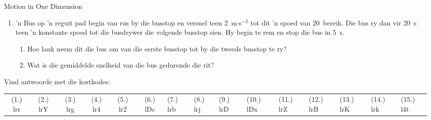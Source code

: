 \begin{eocexercises}{Motion in One Dimension}
\begin{enumerate}[noitemsep, label=\textbf{\arabic*}. ]
    \item 'n Bus op 'n reguit pad begin van rus by die busstop en versnel teen 2~m$\cdot$s$^{-2}$ tot dit 'n spoed van 20~\ms bereik. Die bus ry dan vir 20~s teen 'n konstante spoed tot die busdrywer die volgende busstop sien. Hy begin te rem en stop die bus in 5~s.
    \begin{enumerate}
    \item Hoe lank neem dit die bus om van die eerste busstop tot by die tweede busstop te ry?
    \item Wat is die gemiddelde snelheid van die bus gedurende die rit?
    \end{enumerate}
    \end{enumerate}
    \par {} Vind antwoorde met die kortkodes:
     \par \begin{tabular}[h]{cccccc}
     (1.) lrr  &  (2.) lrY  &  (3.) lrg  &  (4.) lr4  &  (5.) lr2  &  (6.) lDc  & (7.) lrb & (8.) lrj & (9.) lrD & (10.) lDx &
    (11.) lrZ & (12.) lrB & (13.) lrK & (14.) lrk & (15.) l4t
     \end{tabular}
\end{eocexercises}

